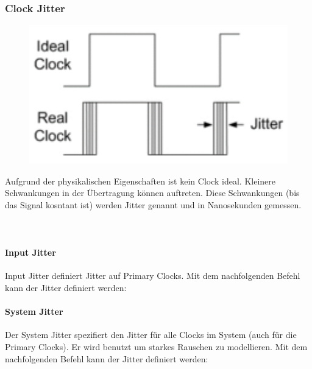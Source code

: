 \subsubsection{Clock Jitter}
\begin{minipage}{0.3\textwidth}
    \begin{figure}[H]
        \includegraphics[width=1\textwidth]{images/clock_jitter.png}
    \end{figure}
\end{minipage}
\hfill
\begin{minipage}{0.65\textwidth}
    Aufgrund der physikalischen Eigenschaften ist kein Clock ideal. Kleinere Schwankungen in der Übertragung können auftreten. Diese Schwankungen (bis das Signal kosntant ist) werden Jitter genannt und in Nanosekunden gemessen. \ \\ \ \\ \ \\
\end{minipage}

\paragraph{Input Jitter}
Input Jitter definiert Jitter auf Primary Clocks. Mit dem nachfolgenden Befehl kann der Jitter definiert werden:


\paragraph{System Jitter}
Der System Jitter spezifiert den Jitter für alle Clocks im System (auch für die Primary Clocks). Er wird benutzt um starkes Rauschen zu modellieren. Mit dem nachfolgenden Befehl kann der Jitter definiert werden:


